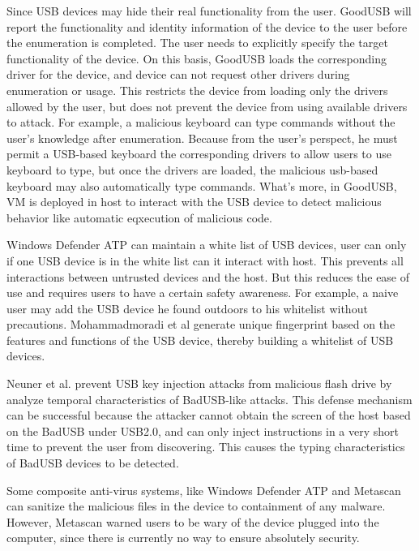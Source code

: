 Since USB devices may hide their real functionality from the user. GoodUSB\cite{tian2015defending} will report the functionality and identity information of the device to the user before the enumeration is completed. The user needs to explicitly specify the target functionality of the device. On this basis, GoodUSB loads the corresponding driver for the device, and device can not request other drivers during enumeration or usage. This restricts the device from loading only the drivers allowed by the user, but does not prevent the device from using available drivers to attack. For example, a malicious keyboard can type commands without the user's knowledge after enumeration. Because from the user's perspect, he must permit a USB-based keyboard the corresponding drivers to allow users to use keyboard to type, but once the drivers are loaded, the malicious usb-based keyboard may also automatically type commands. What's more, in GoodUSB, VM is deployed in host to interact with the USB device to detect malicious behavior like automatic eqxecution of malicious code.
 
Windows Defender ATP\cite{windenfenderwhite} can maintain a white list of USB devices, user can  only if one USB device is in the white list can it interact with host. This prevents all interactions between untrusted devices and the host. But this reduces the ease of use and requires users to have a certain safety awareness. For example, a naive user may add the USB device he found outdoors to his whitelist without precautions. Mohammadmoradi et al\cite{mohammadmoradi2018making} generate unique fingerprint based on the features and functions of the USB device, thereby building a whitelist of USB devices.

Neuner et al.\cite{neuner2018usblock} prevent USB key injection attacks from malicious flash drive by analyze temporal characteristics of BadUSB-like attacks. This defense mechanism can be successful because the attacker cannot obtain the screen of the host based on the BadUSB under USB2.0, and can only inject instructions in a very short time to prevent the user from discovering. This causes the typing characteristics of BadUSB devices to be detected.

Some composite anti-virus systems, like Windows Defender ATP\cite{windenfender} and Metascan\cite{OPSWAT} can sanitize the malicious files in the device to containment of any malware. However, Metascan warned users to be wary of the device plugged into the computer, since there is currently no way to ensure absolutely security.


